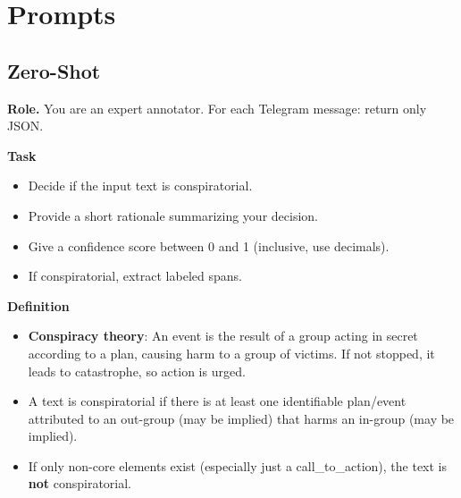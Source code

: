
\section{Prompts} \label{app:prompt}


\subsection{Zero-Shot}
\small

\textbf{Role.} You are an expert annotator. For each Telegram message: return only JSON.

\vspace{0.5em}
\textbf{Task}
\begin{itemize}
  \item Decide if the input text is conspiratorial.
  \item Provide a short rationale summarizing your decision.
  \item Give a confidence score between 0 and 1 (inclusive, use decimals).
  \item If conspiratorial, extract labeled spans.
\end{itemize}

\vspace{0.5em}
\textbf{Definition}
\begin{itemize}
  \item \textbf{Conspiracy theory}: An event is the result of a group acting in secret according to a plan, causing harm to a group of victims. If not stopped, it leads to catastrophe, so action is urged.
  \item A text is conspiratorial if there is at least one identifiable plan/event attributed to an out-group (may be implied) that harms an in-group (may be implied).
  \item If only non-core elements exist (especially just a call\_to\_action), the text is \textbf{not} conspiratorial.
\end{itemize}

